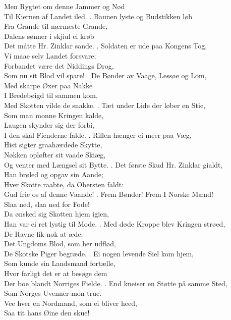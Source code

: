 Men Rygtet om denne Jammer og Nød\\
Til Kiernen af Landet iled.
. Baunen lyste og Budstikken løb\\
Fra Grande til nærmeste Grande,\\
Dalens sønner i skjiul ei krøb\\
Det måtte Hr. Zinklar sande. 
. Soldaten er ude paa Kongens Tog,\\
Vi maae selv Landet forsvare;\\
Forbandet være det Niddings Drog,\\
Som nu sit Blod vil spare!
. De Bønder av Vaage, Lessøe og Lom,\\
Med skarpe Øxer paa Nakke\\
I Bredebøigd til sammen kom,\\
Med Skotten vilde de snakke.
. Tæt under Lide der løber en Stie,\\
Som man monne Kringen kalde,\\
Laugen skynder sig der forbi,\\
I den skal Fienderne falde.
. Riflen hænger ei meer paa Væg,\\
Hist sigter graahærdede Skytte,\\
Nøkken opløfter sit vaade Skiæg,\\
Og venter med Længsel sit Bytte.
. Det første Skud Hr. Zinklar gialdt,\\
Han brøled og opgav sin Aande;\\
Hver Skotte raabte, da Obersten faldt:\\
Gud frie os af denne Vaande!
. Frem Bønder! Frem I Norske Mænd!\\
Slaa ned, slaa ned for Fode!\\
Da ønsked sig Skotten hjem igien,\\
Han var ei ret lystig til Mode.
. Med døde Kroppe blev Kringen strøed,\\
De Ravne fik nok at æde;\\
Det Ungdoms Blod, som her udflød,\\
De Skotske Piger begræde.
. Ei nogen levende Siel kom hjem,\\
Som kunde sin Landsmand fortælle,\\
Hvor farligt det er at besøge dem\\
Der boe blandt Norriges Fielde.
. End kneiser en Støtte på samme Sted,\\
Som Norges Uvenner mon true.\\
Vee hver en Nordmand, som ei bliver heed,\\
Saa tit hans Øine den skue! 


